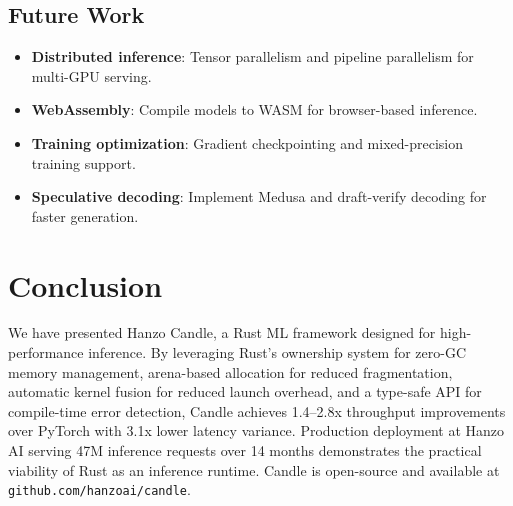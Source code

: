 \documentclass[11pt,twocolumn]{article}
\begin{document}
\subsection{Future Work}

\begin{itemize}[leftmargin=1.1em]
    \item \textbf{Distributed inference}: Tensor parallelism and pipeline parallelism for multi-GPU serving.
    \item \textbf{WebAssembly}: Compile models to WASM for browser-based inference.
    \item \textbf{Training optimization}: Gradient checkpointing and mixed-precision training support.
    \item \textbf{Speculative decoding}: Implement Medusa and draft-verify decoding for faster generation.
\end{itemize}

\section{Conclusion}
\label{sec:conclusion}

We have presented Hanzo Candle, a Rust ML framework designed for high-performance inference. By leveraging Rust's ownership system for zero-GC memory management, arena-based allocation for reduced fragmentation, automatic kernel fusion for reduced launch overhead, and a type-safe API for compile-time error detection, Candle achieves 1.4--2.8x throughput improvements over PyTorch with 3.1x lower latency variance. Production deployment at Hanzo AI serving 47M inference requests over 14 months demonstrates the practical viability of Rust as an inference runtime. Candle is open-source and available at \texttt{github.com/hanzoai/candle}.
\end{document}
